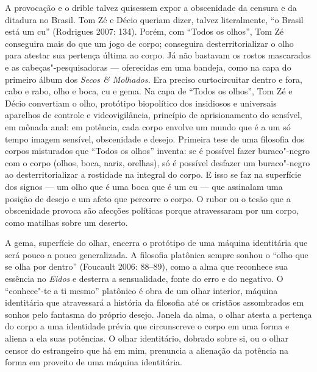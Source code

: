 A provocação e o drible talvez quisessem expor a obscenidade da censura
e da ditadura no Brasil. Tom Zé e Décio queriam dizer, talvez
literalmente, ``o Brasil está um cu'' (Rodrigues 2007: 134). Porém, com
``Todos os olhos'', Tom Zé conseguira mais do que um jogo de
corpo; conseguira desterritorializar o olho para atestar sua pertença
última ao corpo. Já não bastavam os rostos mascarados e as
cabeças"-pesquisadoras --- oferecidas em uma bandeja, como na capa do
primeiro álbum dos \emph{Secos \& Molhados.} Era preciso curtocircuitar
dentro e fora, cabo e rabo, olho e boca, cu e gema. Na capa de ``Todos
os olhos'', Tom Zé e Décio convertiam o olho, protótipo biopolítico dos
insidiosos e universais aparelhos de controle e videovigilância,
princípio de aprisionamento do sensível, em mônada anal: em potência,
cada corpo envolve um mundo que é a um só tempo imagem sensível,
obscenidade e desejo. Primeira tese de uma filosofia dos corpos
misturados que ``Todos os olhos'' inventa: se é possível fazer
buraco"-negro com o corpo (olhos, boca, nariz, orelhas), só é possível
desfazer um buraco"-negro ao desterritorializar a rostidade na integral
do corpo. E isso se faz na superfície dos signos --- um olho que é uma
boca que é um cu --- que assinalam uma posição de desejo e um afeto que
percorre o corpo. O rubor ou o tesão que a obscenidade provoca são
afecções políticas porque atravessaram por um corpo, como matilhas sobre
um deserto.

A gema, superfície do olhar, encerra o protótipo de uma máquina
identitária que será pouco a pouco generalizada. A filosofia platônica
sempre sonhou o ``olho que se olha por dentro'' (Foucault 2006: 88--89),
como a alma que reconhece sua essência no \emph{Eidos} e desterra a
sensualidade, fonte do erro e do negativo. O ``conhece"-te a ti mesmo''
platônico é obra de um olhar interior, máquina identitária que
atravessará a história da filosofia até os cristãos assombrados em
sonhos pelo fantasma do próprio desejo. Janela da alma, o olhar atesta a
pertença do corpo a uma identidade prévia que circunscreve o corpo em
uma forma e aliena a ela suas potências. O olhar identitário, dobrado
sobre si, ou o olhar censor do estrangeiro que há em mim, prenuncia a
alienação da potência na forma em proveito de uma máquina identitária.

